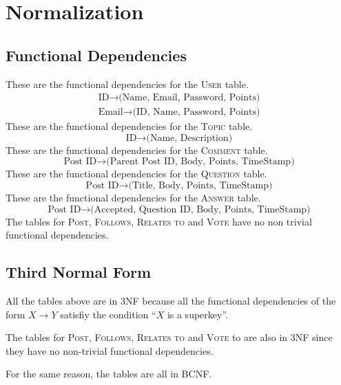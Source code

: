 \section{Normalization}
\subsection{Functional Dependencies}
These are the functional dependencies for the \textsc{User} table.
\begin{gather*}
	\text{ID} \to \text{(Name, Email, Password, Points)} \\
	\text{Email} \to \text{(ID, Name, Password, Points)}
\end{gather*}
These are the functional dependencies for the \textsc{Topic} table.
\[\text{ID} \to \text{(Name, Description)}\]
These are the functional dependencies for the \textsc{Comment} table.
\[\text{Post ID} \to \text{(Parent Post ID, Body, Points, TimeStamp)}\]
These are the functional dependencies for the \textsc{Question} table.
\[\text{Post ID} \to \text{(Title, Body, Points, TimeStamp)}\]
These are the functional dependencies for the \textsc{Answer} table.
\[\text{Post ID} \to \text{(Accepted, Question ID, Body, Points, TimeStamp)}\]
The tables for \textsc{Post}, \textsc{Follows}, \textsc{Relates to} and \textsc{Vote} have no non trivial functional dependencies.


\subsection{Third Normal Form}
All the tables above are in 3NF because all the functional dependencies of the form \(X \to Y\) satisfiy the condition ``\(X\) is a superkey''.

The tables for \textsc{Post}, \textsc{Follows}, \textsc{Relates to} and \textsc{Vote} to are also in 3NF since they have no non-trivial functional dependencies.

For the same reason, the tables are all in BCNF.